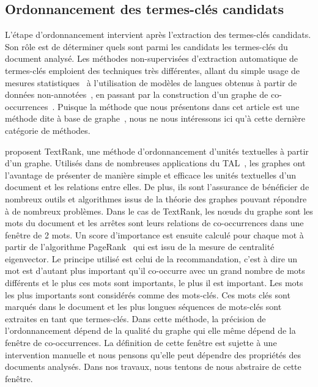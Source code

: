  \subsection{Ordonnancement des termes-clés candidats}
  \label{subsec:ordonnancement_des_termes_cles_candidats}
    L'étape d'ordonnancement intervient après l'extraction des termes-clés
    candidats. Son rôle est de déterminer quels sont parmi les candidats les
    termes-clés du document analysé.
    Les méthodes non-supervisées d'extraction automatique de termes-clés
    emploient des techniques très différentes, allant du simple usage de mesures
    statistiques~\cite{jones1972tfidf,paukkeri2010likey} à l'utilisation de
    modèles de langues obtenus à partir de données
    non-annotées~\cite{tomokiyo2003languagemodel}, en passant par la
    construction d'un graphe de co-occurrences~\cite{mihalcea2004textrank}.
    Puisque la méthode que nous présentons dans cet article est une méthode dite
    \og à base de graphe~\fg, nous ne nous intéressons ici qu'à cette dernière
    catégorie de méthodes.

     proposent TextRank, une méthode
    d'ordonnancement d'unités textuelles à partir d'un graphe. Utilisés dans de
    nombreuses applications du TAL~\cite{kozareva2013textgraphs}, les graphes
    ont l'avantage de présenter de manière simple et efficace les unités
    textuelles d'un document et les relations entre elles. De plus, ils sont
    l'assurance de bénéficier de nombreux outils et algorithmes issus de la
    théorie des graphes pouvant répondre à de nombreux problèmes. Dans le cas de
    TextRank, les n\oe{}uds du graphe sont les mots du document et les arrêtes
    sont leurs relations de co-occurrences dans une fenêtre de 2 mots. Un score
    d'importance est ensuite calculé pour chaque mot à partir de l'algorithme
    PageRank~\cite{brin1998pagerank} qui est issu de la mesure de centralité
    eigenvector. Le principe utilisé est celui de la recommandation, c'est à
    dire un mot est d'autant plus important qu'il co-occurre avec un grand
    nombre de mots différents et le plus ces mots sont importants, le plus il
    est important. Les mots les plus importants sont considérés comme des
    mots-clés. Ces mots clés sont marqués dans le document et les plus longues
    séquences de mots-clés sont extraites en tant que termes-clés. Dans cette
    méthode, la précision de l'ordonnancement dépend de la qualité du graphe qui
    elle même dépend de la fenêtre de co-occurrences. La définition de cette
    fenêtre est sujette à une intervention manuelle et nous pensons qu'elle peut
    dépendre des propriétés des documents analysés. Dans nos travaux, nous
    tentons de nous abstraire de cette fenêtre.

